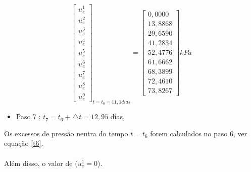 \documentclass{article} %
\begin{document}
\begin{equation}\label{t6}
\begin{bmatrix}
u_e^1\\
u_e^2\\
u_e^3\\
u_e^4\\
u_e^5\\
u_e^6\\
u_e^7\\
u_e^8\\
u_e^9
\end{bmatrix}_{t=t_6=11,1dias}=\begin{bmatrix}
0,0000\\
13,8868\\
29,6590\\
41,2834\\
52,4776\\
61,6662\\
68,3899\\
72,4610\\
73,8267
\end{bmatrix}kPa
\end{equation}
\begin{itemize}
	\item Paso 7 : \(t_7=t_6+\triangle t=12,95\) días,
\end{itemize}

Os excessos de pressão neutra do tempo \(t=t_6\) forem calculados no paso 6, ver equação \ref{t6}.\\
\\
\indent Além disso, o valor de (\(u_e^1=0\)).\\
\end{document}
